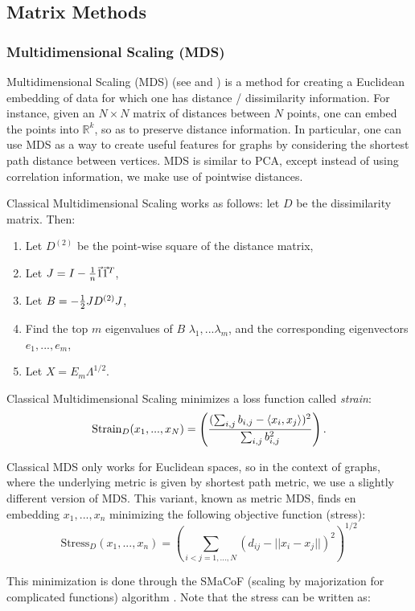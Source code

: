 \subsection{Matrix Methods}
\subsubsection{Multidimensional Scaling (MDS)}
Multidimensional Scaling (MDS) (see \cite{cox2000multidimensional} and \cite{borg2003modern}) is a method for creating a Euclidean embedding of data for which one has distance / dissimilarity information. For instance, given an $N \times N$ matrix of distances between $N$ points, one can embed the points into $\mathbb{R}^k$, so as to preserve distance information. In particular, one can use MDS as a way to create useful features for graphs by considering the shortest path distance between vertices. MDS is similar to PCA, except instead of using correlation information, we make use of pointwise distances.

Classical Multidimensional Scaling works as follows: let $D$ be the dissimilarity matrix. Then:
\begin{enumerate}
  \item Let $D^{(2)}$ be the point-wise square of the distance matrix,
  \item Let $J = I - {1\over n}\vec{1}\vec{1}^T$,
  \item Let $B = -{1 \over 2}JD^{(2)}J$,
  \item Find the top $m$ eigenvalues of $B$ $\lambda_1, ... \lambda_m$, and the corresponding eigenvectors $e_1, ... , e_m$,
  \item Let $X = E_m\Lambda^{1/2}$.
\end{enumerate}

Classical Multidimensional Scaling minimizes a loss function called \emph{strain}:
\[
    \text{Strain}_D(x_1, ... , x_N) = \left( ({\sum_{i,j}b_{i,j}- \langle x_i,x_j \rangle})^2 \over \sum_{i,j}b_{i,j}^2\right).
\]

Classical MDS only works for Euclidean spaces, so in the context of graphs, where the underlying metric is given by shortest path metric, we use a slightly different version of MDS. This variant, known as metric MDS, finds en embedding $x_1, ... , x_n$ minimizing the following objective function (stress):
\[
    \text{Stress}_D(x_1, ... , x_n) = \left(\sum_{i < j = 1, ... ,N}(d_{ij} - ||x_i - x_j||)^2\right)^{1/2}
\]

This minimization is done through the SMaCoF (scaling by majorization for complicated functions) algorithm \cite{de2011applications}. Note that the stress can be written as:

